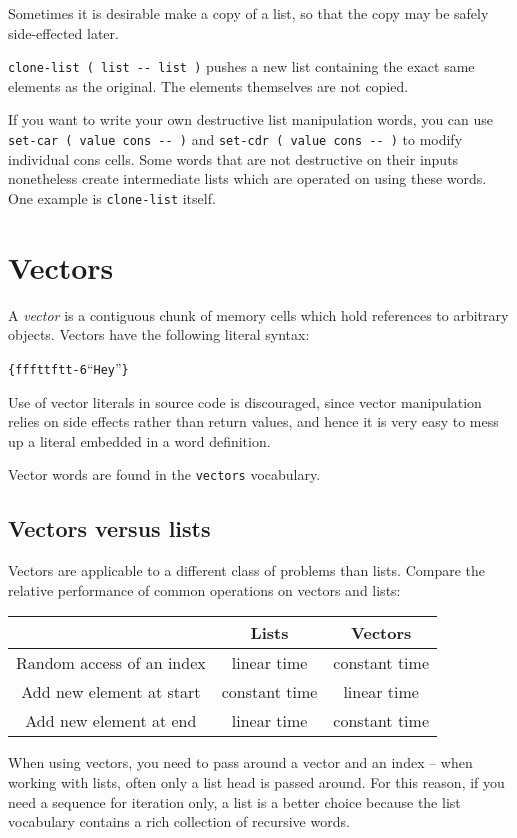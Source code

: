 \documentclass[english]{article}
\providecommand{\tabularnewline}{\\}
\begin{document}
Sometimes it is desirable make a copy of a list, so that the copy
may be safely side-effected later.

\texttt{clone-list ( list -{}- list )} pushes a new list containing
the exact same elements as the original. The elements themselves are
not copied.

If you want to write your own destructive list manipulation words,
you can use \texttt{set-car ( value cons -{}- )} and \texttt{set-cdr
( value cons -{}- )} to modify individual cons cells. Some words that
are not destructive on their inputs nonetheless create intermediate
lists which are operated on using these words. One example is \texttt{clone-list}
itself.


\section{\label{sub:Vectors}Vectors}

A \emph{vector} is a contiguous chunk of memory cells which hold references to arbitrary
objects. Vectors have the following literal syntax:

\begin{alltt}
\{ f f f t t f t t -6 {}``Hey'' \}
\end{alltt}
Use of vector literals in source code is discouraged, since vector
manipulation relies on side effects rather than return values, and
hence it is very easy to mess up a literal embedded in a word definition.

Vector words are found in the \texttt{vectors} vocabulary.

\subsection{Vectors versus lists}

Vectors are applicable to a different class of problems than lists.
Compare the relative performance of common operations on vectors and
lists:

\begin{tabular}{|c|c|c|}
\hline 
&
Lists&
Vectors\tabularnewline
\hline
\hline 
Random access of an index&
linear time&
constant time\tabularnewline
\hline 
Add new element at start&
constant time&
linear time\tabularnewline
\hline 
Add new element at end&
linear time&
constant time\tabularnewline
\hline
\end{tabular}

When using vectors, you need to pass around a vector and an index
-- when working with lists, often only a list head is passed around.
For this reason, if you need a sequence for iteration only, a list
is a better choice because the list vocabulary contains a rich collection
of recursive words.
\end{document}
